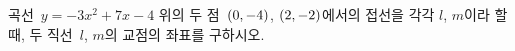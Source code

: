곡선~$y=-3x^2+7x-4$ 위의 두 점~$(0{,}\mkern3mu\mathopen{}-4)$, $(2{,}\mkern3mu\mathopen{}-2)$에서의 접선을 각각 $l$, $m$이라 할 때, 두 직선~$l$, $m$의 교점의 좌표를 구하시오.
